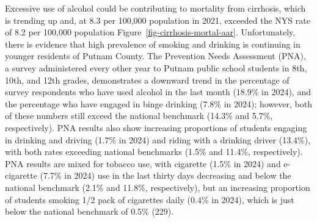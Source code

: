 \documentclass[
  english,
  letterpaper,
]{report}
\begin{document}
Excessive use of alcohol could be contributing to mortality from
cirrhosis, which is trending up and, at 8.3 per 100,000 population in
2021, exceeded the NYS rate of 8.2 per 100,000 population
Figure~\ref{fig-cirrhosis-mortal-aar}. Unfortunately, there is evidence
that high prevalence of smoking and drinking is continuing in younger
residents of Putnam County. The Prevention Needs Assessment (PNA), a
survey administered every other year to Putnam public school students in
8th, 10th, and 12th grades, demonstrates a downward trend in the
percentage of survey respondents who have used alcohol in the last month
(18.9\% in 2024), and the percentage who have engaged in binge drinking
(7.8\% in 2024); however, both of these numbers still exceed the
national benchmark (14.3\% and 5.7\%, respectively). PNA results also
show increasing proportions of students engaging in drinking and driving
(1.7\% in 2024) and riding with a drinking driver (13.4\%), with both
rates exceeding national benchmarks (1.5\% and 11.4\%, respectively).
PNA results are mixed for tobacco use, with cigarette (1.5\% in 2024)
and e-cigarette (7.7\% in 2024) use in the last thirty days decreasing
and below the national benchmark (2.1\% and 11.8\%, respectively), but
an increasing proportion of students smoking 1/2 pack of cigarettes
daily (0.4\% in 2024), which is just below the national benchmark of
0.5\% (229).
\end{document}
